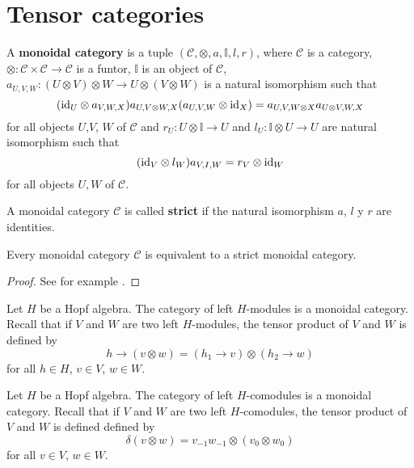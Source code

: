 \section{Tensor categories}

\begin{definition}
A \textbf{monoidal category} is a tuple
$(\mathcal{C},\otimes,a,\mathbb{I},l,r)$, where $\mathcal{C}$ is a category,
$\otimes:\mathcal{C}\times\mathcal{C}\to\mathcal{C}$ is a funtor, $\mathbb{I}$
is an object of $\mathcal{C}$, $a_{U,V,W}:(U\otimes V)\otimes W\to
U\otimes(V\otimes W)$ is a natural isomorphism such that 
\begin{equation}
(\id_{U}\otimes a_{V,W,X})a_{U,V\otimes W,X}(a_{U,V,W}\otimes\id_{X})=a_{U,V,W\otimes X}a_{U\otimes V,W,X}\label{eq:pentagon}
\end{equation}
for all objects $U$,$V$, $W$ of $\mathcal{C}$ and $r_{U}:U\otimes\mathbb{I}\to U$
and $l_{U}:\mathbb{I}\otimes U\to U$ are natural isomorphism such
that 
\begin{equation}
(\id_{V}\otimes l_{W})a_{V,I,W}=r_{V}\otimes\id_{W}\label{eq:triangles}
\end{equation}
for all objects $U,W$ of $\mathcal{C}$.
\end{definition}

\begin{definition}
A monoidal category $\mathcal{C}$ is called \textbf{strict} if the natural
isomorphism $a$, $l$ y $r$ are identities. 
\end{definition}

\begin{theorem}
Every monoidal category $\mathcal{C}$ is equivalent to a strict monoidal
category.
\end{theorem}

\begin{proof}
See for example \cite[Theorem XI.5.3]{MR1321145}.
\end{proof}

\begin{example}
Let $H$ be a Hopf algebra. The category of left $H$-modules is a monoidal
category.  Recall that if $V$ and $W$ are two left $H$-modules, the tensor
product of $V$ and $W$ is defined by 
\[
h\rightarrow(v\otimes w)=(h_{1}\rightarrow v)\otimes(h_{2}\rightarrow w)
\]
for all $h\in H$, $v\in V$, $w\in W$. 
\end{example}

\begin{example}
Let $H$ be a Hopf algebra. The category of left $H$-comodules is a monoidal
category.  Recall that if $V$ and $W$ are two left $H$-comodules, the tensor
product of $V$ and $W$ is defined defined by 
\[
\delta(v\otimes w)=v_{-1}w_{-1}\otimes(v_0\otimes w_0)
\]
for all $v\in V$, $w\in W$.
\end{example}

